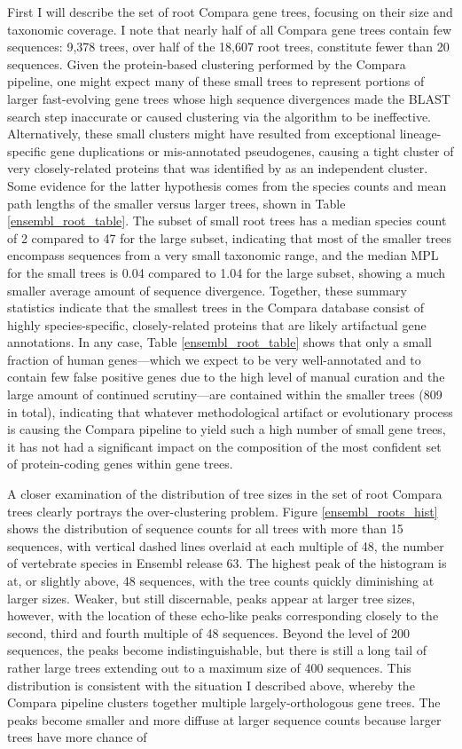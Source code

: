 First I will describe the set of root Compara gene trees, focusing on
their size and taxonomic coverage. I note that nearly half of all
Compara gene trees contain few sequences: 9,378 trees, over half of
the 18,607 root trees, constitute fewer than 20 sequences. Given the
protein-based clustering performed by the Compara pipeline, one might
expect many of these small trees to represent portions of larger
fast-evolving gene trees whose high sequence divergences made the
BLAST search step inaccurate or caused clustering via the \hclust
algorithm to be ineffective. Alternatively, these small clusters might
have resulted from exceptional lineage-specific gene duplications or
mis-annotated pseudogenes, causing a tight cluster of very
closely-related proteins that was identified by \hclust as an
independent cluster. Some evidence for the latter hypothesis comes
from the species counts and mean path lengths of the smaller versus
larger trees, shown in Table \ref{ensembl_root_table}. The subset of
small root trees has a median species count of 2 compared to 47 for
the large subset, indicating that most of the smaller trees encompass
sequences from a very small taxonomic range, and the median MPL for
the small trees is 0.04 compared to 1.04 for the large subset, showing
a much smaller average amount of sequence divergence. Together, these
summary statistics indicate that the smallest trees in the Compara
database consist of highly species-specific, closely-related proteins
that are likely artifactual gene annotations. In any case, Table
\ref{ensembl_root_table} shows that only a small fraction of human
genes---which we expect to be very well-annotated and to contain few
false positive genes due to the high level of manual curation and the
large amount of continued scrutiny---are contained within the smaller
trees (809 in total), indicating that whatever methodological artifact
or evolutionary process is causing the Compara pipeline to yield such
a high number of small gene trees, it has not had a significant impact
on the composition of the most confident set of protein-coding genes
within gene trees.

A closer examination of the distribution of tree sizes in the set of
root Compara trees clearly portrays the over-clustering
problem. Figure \ref{ensembl_roots_hist} shows the distribution of
sequence counts for all trees with more than 15 sequences, with
vertical dashed lines overlaid at each multiple of 48, the number of
vertebrate species in Ensembl release 63. The highest peak of the
histogram is at, or slightly above, 48 sequences, with the tree counts
quickly diminishing at larger sizes. Weaker, but still discernable,
peaks appear at larger tree sizes, however, with the location of these
echo-like peaks corresponding closely to the second, third and fourth
multiple of 48 sequences. Beyond the level of 200 sequences, the peaks
become indistinguishable, but there is still a long tail of rather
large trees extending out to a maximum size of 400 sequences. This
distribution is consistent with the situation I described above,
whereby the Compara pipeline clusters together multiple
largely-orthologous gene trees. The peaks become smaller and more
diffuse at larger sequence counts because larger trees have more chance of 



